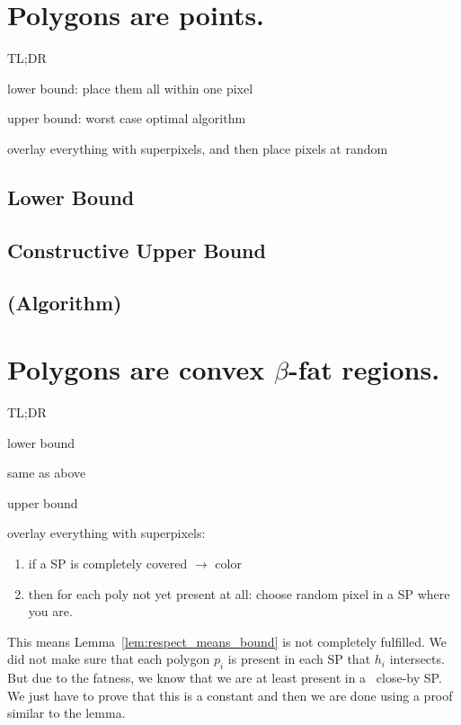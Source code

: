 \documentclass[a4paper, UKenglish]{lipics-v2018}
\begin{document}
\section{Polygons are points.}
\label{sec:points}

TL;DR

lower bound:
place them all within one pixel

upper bound: worst case optimal algorithm

overlay everything with superpixels, and then place pixels at random

\subsection{Lower Bound}
\label{sub:points_lower}




\subsection{Constructive Upper Bound}
\label{sub:points_upper}




\subsection{(Algorithm)}
\label{sub:points_algo}







\section{Polygons are convex $\beta$-fat regions.}
\label{sec:fat}
TL;DR

lower bound

same as above

upper bound

overlay everything with superpixels:
\begin{enumerate}
	\item if a SP is completely covered $\rightarrow$ color
	\item then for each poly not yet present at all: choose random pixel in a SP where you are.
\end{enumerate}
This means Lemma~\ref{lem:respect_means_bound} is not completely fulfilled. We did not make sure that each polygon $p_i$ is present in each SP that $h_i$ intersects. But due to the fatness, we know that we are at least present in a ~close-by SP. We just have to prove that this is a constant and then we are done using a proof similar to the lemma.
\end{document}
